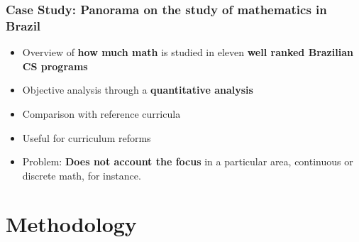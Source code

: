 \documentclass{beamer}
\begin{document}
\begin{frame}
\frametitle{Case Study: Panorama on the study of mathematics in Brazil}
\begin{itemize}
	\item Overview of \textbf{\textcolor{n_red}{how much math}} is studied in
	eleven \textbf{\textcolor{n_blue}{well ranked Brazilian CS programs}}
	\item Objective analysis through a \textbf{\textcolor{n_violet}{quantitative analysis}}
	\item Comparison with reference curricula
	\item Useful for curriculum reforms
	\item Problem: \textbf{\textcolor{RawSienna}{Does not account the focus}}
	in a particular area, continuous or discrete math, for instance.
\end{itemize}
\end{frame}


\section{Methodology}
\subsection{}
\end{document}
